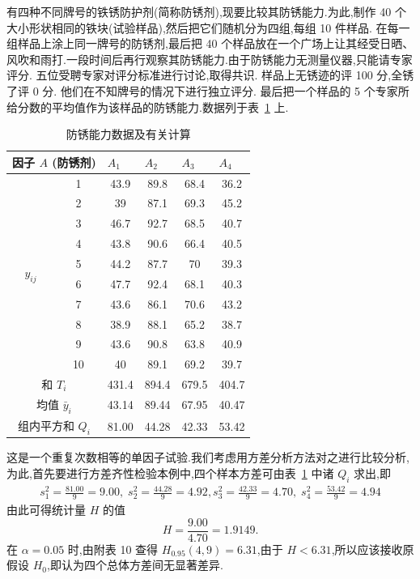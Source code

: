 \begin{example}
  有四种不同牌号的铁锈防护剂(简称防锈剂),现要比较其防锈能力.为此,制作 40 个大小形状相同的铁块(试验样品),然后把它们随机分为四组,每组 10 件样品. 在每一组样品上涂上同一牌号的防锈剂,最后把 40 个样品放在一个广场上让其经受日晒、风吹和雨打.一段时间后再行观察其防锈能力.由于防锈能力无测量仪器,只能请专家评分. 五位受聘专家对评分标准进行讨论,取得共识. 样品上无锈迹的评 100 分,全锈了评 0 分. 他们在不知牌号的情况下进行独立评分. 最后把一个样品的 5 个专家所给分数的平均值作为该样品的防锈能力.数据列于表~\ref{tab:8.3.1} 上.
\begin{table}[htbp]
  \centering
  \caption{防锈能力数据及有关计算}
    \begin{tabular}{c|c|cccc}
    \toprule
    \multicolumn{2}{c|}{因子 $A$ (防锈剂)} & \multicolumn{1}{l}{$A_1$} & \multicolumn{1}{l}{$A_2$} & \multicolumn{1}{l}{$A_3$} & \multicolumn{1}{l}{$A_4$} \\
    \midrule
    \multirow{10}[2]{*}{$y_{ij}$} &1 & 43.9  & 89.8  & 68.4  & 36.2 \\
          & 2 & 39    & 87.1  & 69.3  & 45.2 \\
          & 3 & 46.7  & 92.7  & 68.5  & 40.7 \\
          & 4 & 43.8  & 90.6  & 66.4  & 40.5 \\
          & 5 & 44.2  & 87.7  & 70    & 39.3 \\
          & 6 & 47.7  & 92.4  & 68.1  & 40.3 \\
          & 7 & 43.6  & 86.1  & 70.6  & 43.2 \\
          & 8 & 38.9  & 88.1  & 65.2  & 38.7 \\
          & 9 & 43.6  & 90.8  & 63.8  & 40.9 \\
          & 10 & 40    & 89.1  & 69.2  & 39.7 \\
    \midrule
    \multicolumn{2}{c|}{和 $T_i$} & 431.4 & 894.4 & 679.5 & 404.7 \\
    \multicolumn{2}{c|}{均值 $\bar{y}_i$} & 43.14 & 89.44 & 67.95 & 40.47 \\
    \multicolumn{2}{c|}{组内平方和 $Q_i$} & 81.00    & 44.28 & 42.33 & 53.42 \\
    \bottomrule
    \end{tabular}%
  \label{tab:8.3.1}%
\end{table}%
这是一个重复次数相等的单因子试验.我们考虑用方差分析方法对之进行比较分析,为此,首先要进行方差齐性检验本例中,四个样本方差可由表~\ref{tab:8.3.1} 中诸 $Q_i$ 求出,即
\begin{align*}
  s_1^2 = \frac{81.00}{9} = 9.00, \; s_2^2 = \frac{44.28}{9} = 4.92,
  s_3^2 = \frac{42.33}{9} = 4.70, \; s_4^2 = \frac{53.42}{9} = 4.94
\end{align*}
由此可得统计量 $H$ 的值
\begin{equation*}
  H = \frac{9.00}{4.70} = 1.9149.
\end{equation*}
在 $\alpha=0.05$ 时,由附表 10 查得 $H_{0.95}(4,9)=6.31$,由于 $H<6.31$,所以应该接收原假设 $H_0$,即认为四个总体方差间无显著差异.


\end{example}
